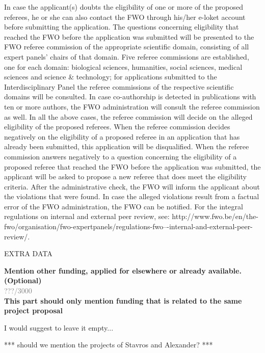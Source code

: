 \documentclass[11pt,dvipsnames,usenames,a4paper]{article}
\begin{document}
{In case the applicant(s) doubts the eligibility of one or more of the proposed referees, he or she can also contact the FWO through his/her e-loket account before submitting the application. The questions concerning eligibility that reached the FWO before the application was submitted will be presented to the FWO referee commission of the appropriate scientific domain, consisting of all expert panels’ chairs of that domain. Five referee commissions are established, one for each domain: biological sciences, humanities, social sciences, medical sciences and science \& technology; for applications submitted to the Interdisciplinary Panel the referee commissions of the respective scientific domains will be consulted. In case co-authorship is detected in publications with ten or more authors, the FWO administration will consult the referee commission as well. In all the above cases, the referee commission will decide on the alleged eligibility of the proposed referees. When the referee commission decides negatively on the eligibility of a proposed referee in an application that has already been submitted, this application will be disqualified. When the referee commission answers negatively to a question concerning the eligibility of a proposed referee that reached the FWO before the application was submitted, the applicant will be asked to propose a new referee that does meet the eligibility criteria. 
After the administrative check, the FWO will inform the applicant about the violations that were found. In case the alleged violations result from a factual error of the FWO administration, the FWO can be notified. 
For the integral regulations on internal and external peer review, see: http://www.fwo.be/en/the-fwo/organisation/fwo-expertpanels/regulations-fwo–-internal-and-external-peer-review/.}

\vspace{10pt}

\begin{shaded}\centering EXTRA DATA \end{shaded}

\textbf{Mention other funding, applied for elsewhere or already available. (Optional)}\\
\textcolor{Gray}{???/3000}\\

{\color{blue}\bf This part should only mention funding that is related to the same project proposal} 

I would suggest to leave it empty...

*** should we mention the projects of Stavros and Alexander? ***
\end{document}
